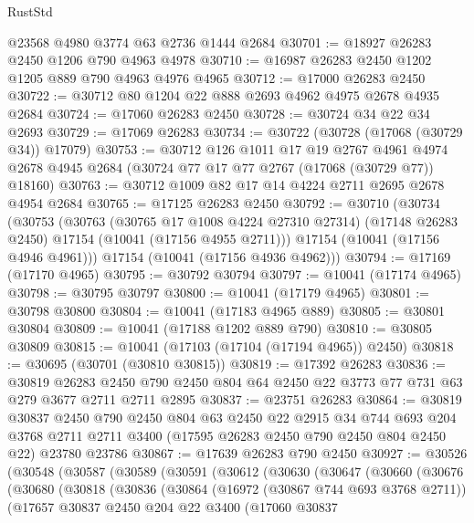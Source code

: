 \begin{lexlean}{RustStd}
\begin{coremodule}
    @23568
    @4980
    @3774
    @63
    @2736
    @1444
    @2684
@30701 := @18927 @26283 @2450 @1206 @790 @4963 @4978
@30710 := @16987 @26283 @2450 @1202 @1205 @889 @790 @4963 @4976 @4965
@30712 := @17000 @26283 @2450
@30722 := @30712 @80 @1204 @22 @888 @2693 @4962 @4975 @2678 @4935 @2684
@30724 := @17060 @26283 @2450
@30728 := @30724 @34 @22 @34 @2693
@30729 := @17069 @26283
@30734 := @30722 (@30728 (@17068 (@30729 @34)) @17079)
@30753 := @30712
    @126
    @1011
    @17
    @19
    @2767
    @4961
    @4974
    @2678
    @4945
    @2684
    (@30724 @77 @17 @77 @2767 (@17068 (@30729 @77)) @18160)
@30763 := @30712 @1009 @82 @17 @14 @4224 @2711 @2695 @2678 @4954 @2684
@30765 := @17125 @26283 @2450
@30792 := @30710
    (@30734
      (@30753
        (@30763
          (@30765 @17 @1008 @4224 @27310 @27314)
          (@17148 @26283 @2450)
          @17154
          (@10041 (@17156 @4955 @2711)))
        @17154
        (@10041 (@17156 @4946 @4961)))
      @17154
      (@10041 (@17156 @4936 @4962)))
@30794 := @17169 (@17170 @4965)
@30795 := @30792 @30794
@30797 := @10041 (@17174 @4965)
@30798 := @30795 @30797
@30800 := @10041 (@17179 @4965)
@30801 := @30798 @30800
@30804 := @10041 (@17183 @4965 @889)
@30805 := @30801 @30804
@30809 := @10041 (@17188 @1202 @889 @790)
@30810 := @30805 @30809
@30815 := @10041 (@17103 (@17104 (@17194 @4965)) @2450)
@30818 := @30695 (@30701 (@30810 @30815))
@30819 := @17392 @26283
@30836 := @30819
    @26283
    @2450
    @790
    @2450
    @804
    @64
    @2450
    @22
    @3773
    @77
    @731
    @63
    @279
    @3677
    @2711
    @2711
    @2895
@30837 := @23751 @26283
@30864 := @30819
    @30837
    @2450
    @790
    @2450
    @804
    @63
    @2450
    @22
    @2915
    @34
    @744
    @693
    @204
    @3768
    @2711
    @2711
    @3400
    (@17595 @26283 @2450 @790 @2450 @804 @2450 @22)
    @23780
    @23786
@30867 := @17639 @26283 @790 @2450
@30927 := @30526
    (@30548
      (@30587
        (@30589
          (@30591
            (@30612
              (@30630
                (@30647
                  (@30660
                    (@30676
                      (@30680
                        (@30818
                          (@30836
                            (@30864
                              (@16972 (@30867 @744 @693 @3768 @2711))
                              (@17657
                                @30837
                                @2450
                                @204
                                @22
                                @3400
                                (@17060
                                  @30837

\end{coremodule}
\end{lexlean}
